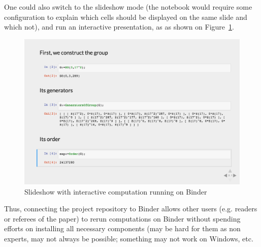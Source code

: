 One could also switch to the slideshow mode (the notebook would require
some configuration to explain which cells should be displayed on the
same slide and which not), and run an interactive presentation, as
as shown on Figure~\ref{fig:unipoly-slide}.

\begin{figure}[!ht]
    \centering
    \includegraphics[width=\textwidth]{images/unipoly-slide}
    \caption{Slideshow with interactive computation running on Binder}
    \label{fig:unipoly-slide}
\end{figure}

Thus, connecting the project repository to Binder allows other users
(e.g. readers or referees of the paper) to rerun computations on Binder
without spending efforts on installing all necessary components
(may be hard for them as non experts, may not always be possible;
something may not work on Windows, etc.

